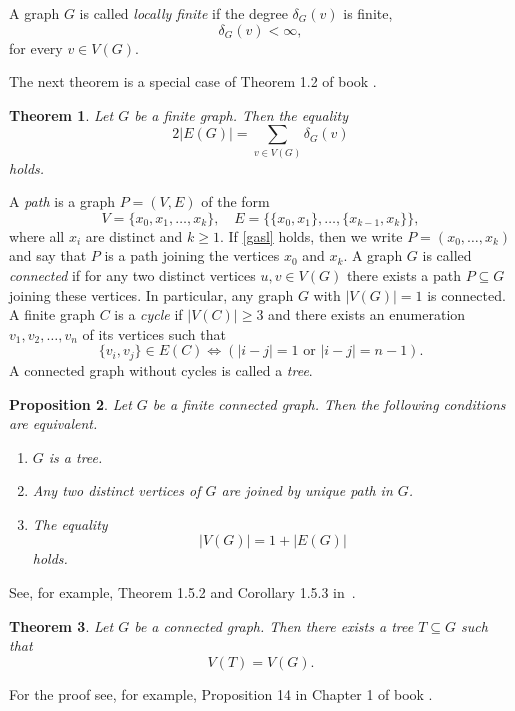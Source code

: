 \documentclass[pdflatex,sn-mathphys-num]{sn-jnl}%
\theoremstyle{thmstyleone}%
\newtheorem{Theorem}{Theorem}[section]
\newtheorem{Proposition}[Theorem]{Proposition}
\theoremstyle{thmstyletwo}%
\theoremstyle{thmstylethree}%
\theoremstyle{thmstyletwo}%
\theoremstyle{thmstylethree}%
\begin{document}
A graph $G$ is called {\it locally finite} if the degree $\delta_G(v)$ is finite,
\[
\delta_G(v) <\infty,
\]
for every $v\in V(G)$.




The next theorem is a special case of Theorem 1.2 of book \cite{BM2008}.


\begin{Theorem}\label{rghki} Let $G$ be a finite graph. Then the equality
\[
2|E(G)| = \sum_{v \in V(G)} \delta_G(v)
\]
holds.
\end{Theorem}




A {\it path} is a graph $P=(V,E)$ of the form
\begin{equation}
    \label{gasl}
V=\{x_0,x_1,\dots,x_k\}, \quad E=\{\{x_0,x_1\},\dots,\{x_{k-1},x_k\}\},
\end{equation}
where all $x_i$ are distinct and $k \geq 1$. If \eqref{gasl} holds, then we write $P=(x_0,\ldots,x_k)$ and say that $P$ is a path joining the vertices $x_0$ and  $x_k$.  
A graph $G$ is called {\it connected} if for any two distinct vertices $u,v\in V(G)$ there exists a path $P\subseteq G$ joining these vertices. In particular, any graph $G$ with $|V(G)|=1$ is connected.
A finite graph $C$ is a {\it cycle} if $|V(C)|\ge 3$ and there exists an enumeration $v_1,v_2,\dots,v_n$ of its vertices such that
\[
\{v_i,v_j\}\in E(C) \iff (|i-j|=1 \text{ or } |i-j|=n-1).
\]
 A connected graph without cycles is called a {\it tree}. 


\begin{Proposition}\label{hfdsxbj} Let $G$ be a finite connected graph. Then the following conditions are equivalent.
\begin{enumerate}
\item[(i)] $G$ is a tree.
\item[(ii)] Any two distinct vertices of $G$ are joined by unique path in $G$.
\item[(iii)] The equality
\[
|V(G)| = 1 + |E(G)|
\]
holds.
\end{enumerate}
\end{Proposition}

See, for example, Theorem 1.5.2 and Corollary 1.5.3 in~\cite{Diestel2017}.




\begin{Theorem}\label{kiii}
     Let $G$ be a connected graph. Then there exists a tree $T \subseteq G$ such that
\[
V(T) = V(G).
\]
\end{Theorem}
For the proof see, for example, Proposition 14 in Chapter 1 of book  \cite{SerreTrees1980}.
\end{document}
